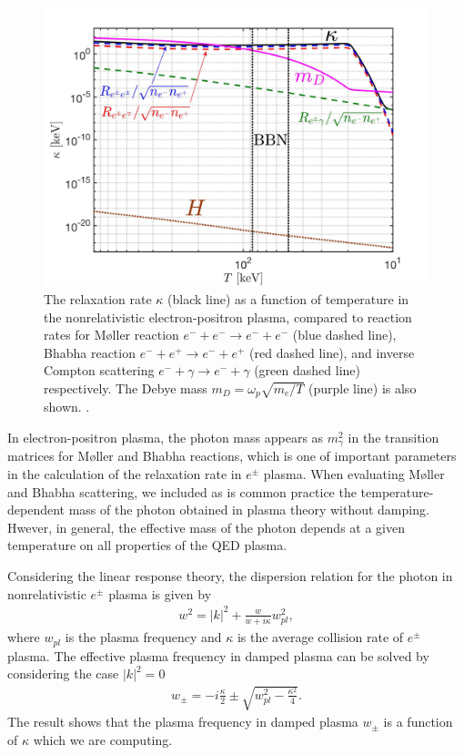 \begin{figure} 
\centerline{\includegraphics[width=0.9\linewidth]{./plots/May152023Kappa_EPPlasma}}
\caption{The relaxation rate $\kappa$ (black line) as a function of temperature in the nonrelativistic electron-positron plasma, compared to reaction rates  for M{\o}ller reaction $e^-+e^-\to e^-+e^-$ (blue dashed line), Bhabha reaction $e^-+e^+\to e^-+e^+$ (red dashed line), and inverse Compton scattering $e^-+\gamma\to e^-+\gamma$ (green dashed line) respectively. The Debye mass $m_D=\omega_{p}\sqrt{m_e/T}$ (purple line) is also shown. . }
\label{RelaxationRate:fig}
\end{figure}


In electron-positron plasma, the photon mass appears as $m_\gamma^2$ in the transition matrices for M{\o}ller and Bhabha reactions, which is one of important parameters in the calculation of the relaxation rate in $e^\pm$ plasma. When evaluating M{\o}ller and Bhabha scattering, we included as is common practice the temperature-dependent mass of the photon obtained in plasma theory without damping. Hwever, in general, the effective mass of the photon depends at a given temperature on all properties of the QED plasma. 

Considering the linear response theory, the dispersion relation for the photon in nonrelativistic $e^\pm$ plasma is given by~\cite{Formanek:2021blc}
\begin{align}\label{dispersion_damping}
w^2=|k|^2+\frac{w}{w+i\kappa}w_{pl}^2,
\end{align}
where $w_{pl}$ is the plasma frequency and $\kappa$ is the average collision rate of $e^\pm$ plasma. The effective plasma frequency in damped plasma can be solved by considering the case $|k|^2=0$~\cite{Formanek:2021blc}
\begin{align}\label{plasmafrequency_damped}
w_{\pm}=-i\frac{\kappa}{2}\pm\sqrt{w^2_{pl}-\frac{\kappa^2}{4}}.
\end{align}
The result shows that the plasma frequency in damped plasma $w_\pm$ is a function of $\kappa$ which we are computing.  

